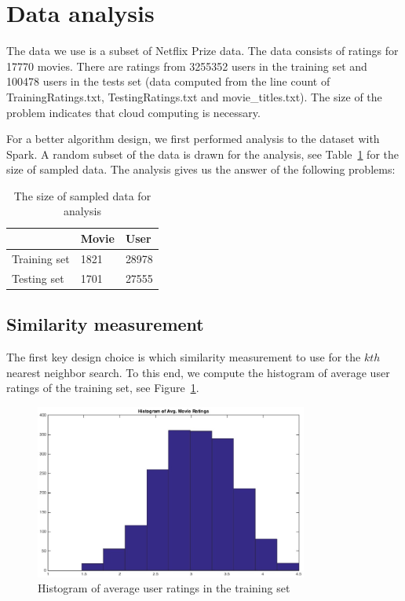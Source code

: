 \section{Data analysis}
The data we use is a subset of Netflix Prize data. The data consists
of ratings for 17770 movies. There are ratings from 3255352 users in
the training set and 100478 users in the tests set (data computed from
the line count of TrainingRatings.txt, TestingRatings.txt and
movie\_titles.txt). The size of the problem indicates that cloud
computing is necessary.

For a better algorithm design, we first performed analysis to the
dataset with Spark. A random subset of the data is drawn for the
analysis, see Table~\ref{tab:subsample} for the size of sampled
data. The analysis gives us the answer of the following problems:

\begin{table}
  \centering
  \begin{tabular}{| p{5cm} | p{3cm} | p{3cm} |}
      \hline
       & Movie & User \\
      \hline
      Training set & 1821 & 28978\\
      \hline
      Testing set & 1701 & 27555\\
      \hline
  \end{tabular}
  \caption{The size of sampled data for analysis}
  \label{tab:subsample}
\end{table}

\subsection*{Similarity measurement}
The first key design choice is which similarity measurement to use for
the $kth$ nearest neighbor search. To this end, we compute the
histogram of average user ratings of the training set, see
Figure~\ref{fig:hist}.
\begin{figure}[!ht]
  \centering
  \includegraphics[width=0.8\textwidth]{images/hist}
  \caption{Histogram of average user ratings in the training set}
  \label{fig:hist}
\end{figure}

